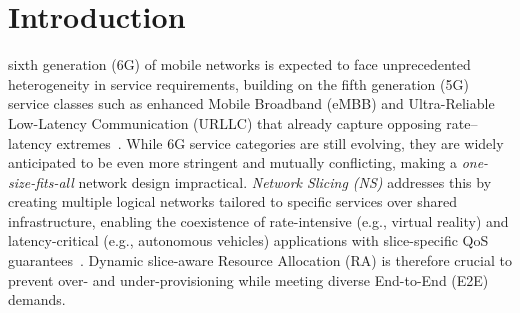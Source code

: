 \documentclass[12pt,lettersize,journal,onecolumn]{IEEEtran}
\begin{document}
\section{Introduction} \label{introduction-section}
 sixth generation (6G) of mobile networks is expected to face unprecedented heterogeneity in service requirements, building on the fifth generation (5G) service classes such as enhanced Mobile Broadband (eMBB) and Ultra-Reliable Low-Latency Communication (URLLC) that already capture opposing rate--latency extremes~\cite{itu23m2160}. While 6G service categories are still evolving, they are widely anticipated to be even more stringent and mutually conflicting, making a \textit{one-size-fits-all} network design impractical. \textit{Network Slicing (NS)} addresses this by creating multiple logical networks tailored to specific services over shared infrastructure, enabling the coexistence of rate-intensive (e.g., virtual reality) and latency-critical (e.g., autonomous vehicles) applications with slice-specific QoS guarantees~\cite{comst24ebrahimi}. Dynamic slice-aware Resource Allocation (RA) is therefore crucial to prevent over- and under-provisioning while meeting diverse End-to-End (E2E) demands. 
\end{document}
